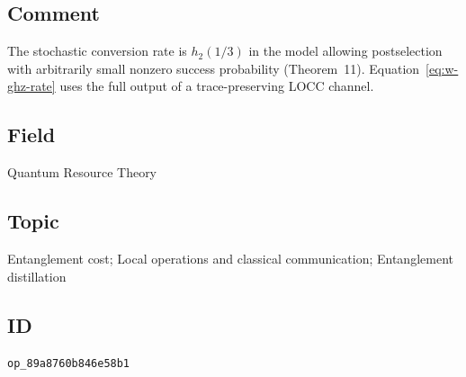 \subsection*{Comment}

The stochastic conversion rate is $h_2(1/3)$ in the model allowing postselection
with arbitrarily small nonzero success probability  (Theorem~11).
Equation~\eqref{eq:w-ghz-rate} uses the full output of a trace-preserving LOCC channel.

\subsection*{Field}

Quantum Resource Theory

\subsection*{Topic}

Entanglement cost; Local operations and classical communication; Entanglement distillation

\subsection*{ID}

\texttt{op\_89a8760b846e58b1}
